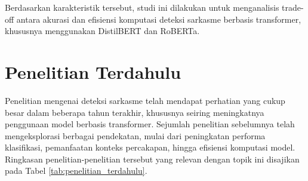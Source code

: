 Berdasarkan karakteristik tersebut, studi ini dilakukan untuk menganalisis trade-off antara akurasi dan efisiensi komputasi deteksi sarkasme berbasis transformer, khususnya menggunakan DistilBERT dan RoBERTa.


\section{Penelitian Terdahulu}

Penelitian mengenai deteksi sarkasme telah mendapat perhatian yang cukup besar dalam beberapa tahun terakhir, khususnya seiring meningkatnya penggunaan model berbasis transformer. Sejumlah penelitian sebelumnya telah mengeksplorasi berbagai pendekatan, mulai dari peningkatan performa klasifikasi, pemanfaatan konteks percakapan, hingga efisiensi komputasi model. Ringkasan penelitian-penelitian tersebut yang relevan dengan topik ini disajikan pada Tabel \ref{tab:penelitian_terdahulu}.


